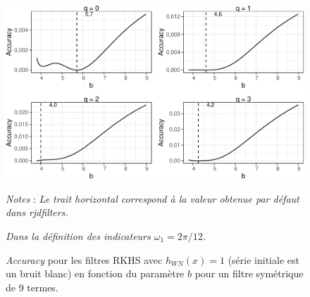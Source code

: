 \documentclass[
  11pt,
  french,
  a4paper]{article}
\newcommand\1{\mathds{1}}
\begin{document}
\begin{figure}[H]

{\centering \includegraphics{img/bookdown/pdf/rkhsoptiaccuracy4wn-1} 

}

\caption[\emph{Accuracy} pour les filtres RKHS avec \(h_{WN}(x)=1\) (série initiale est un bruit blanc) en fonction du paramètre \(b\) pour un filtre symétrique de 9 termes]{\emph{Accuracy} pour les filtres RKHS avec \(h_{WN}(x)=1\) (série initiale est un bruit blanc) en fonction du paramètre \(b\) pour un filtre symétrique de 9 termes.}\label{fig:rkhsoptiaccuracy4wn}

\footnotesize


\emph{Notes} : \emph{Le trait horizontal correspond à la valeur obtenue par défaut dans rjdfilters.}

\emph{Dans la définition des indicateurs \(\omega_1=2\pi/12\).}
\normalsize\end{figure}
\end{document}
